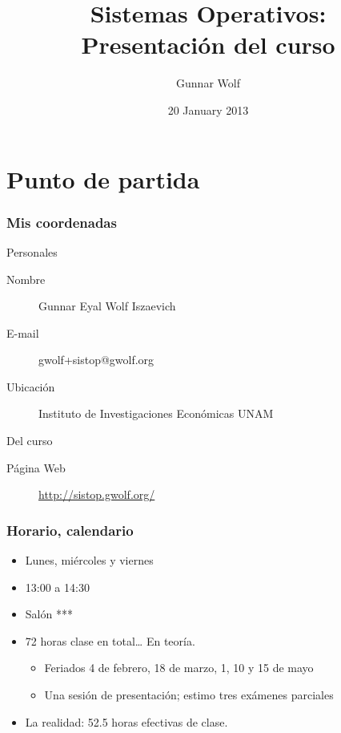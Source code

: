 \documentclass[bigger]{beamer}
\institute{Facultad de Ingeniería, UNAM}
\title{Sistemas Operativos:\\Presentación del curso}
\author{Gunnar Wolf}
\date{20 January 2013}
\begin{document}
\maketitle


\section{Punto de partida}
\label{sec-1}
\begin{frame}[fragile]\frametitle{Mis coordenadas}
\label{sec-1_1}

\begin{center}
Personales
\end{center}

\begin{description}
\item[Nombre] Gunnar Eyal Wolf Iszaevich
\item[E-mail] gwolf+sistop@gwolf.org
\item[Ubicación] Instituto de Investigaciones Económicas UNAM
\end{description}


\begin{center}
Del curso
\end{center}

\begin{description}
\item[Página Web] \href{http://sistop.gwolf.org/}{http://sistop.gwolf.org/}
\end{description}
\end{frame}
\begin{frame}[fragile]\frametitle{Horario, calendario}
\label{sec-1_2}

\begin{itemize}
\item Lunes, miércoles y viernes
\item 13:00 a 14:30
\item Salón ***
\item 72 horas clase en total… En teoría.

\begin{itemize}
\item Feriados 4 de febrero, 18 de marzo, 1, 10 y 15 de mayo
\item Una sesión de presentación; estimo tres exámenes parciales
\end{itemize}

\item La realidad: 52.5 horas efectivas de clase.
\end{itemize}
\end{frame}
\end{document}
